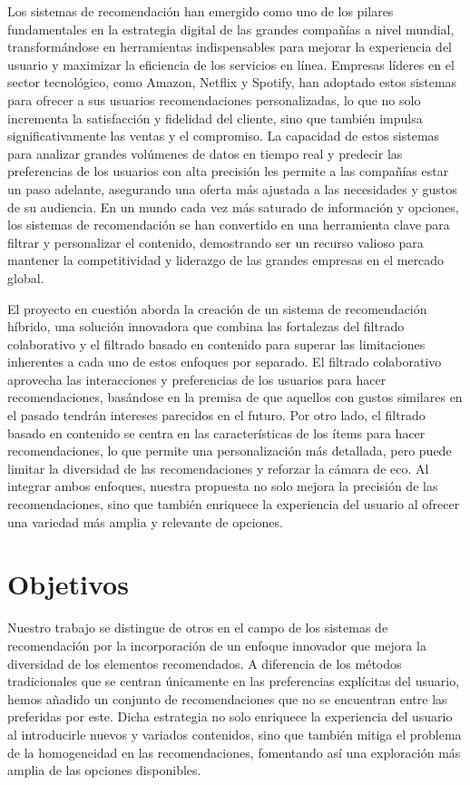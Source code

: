 \documentclass[a4paper,12pt]{report}
\begin{document}
Los sistemas de recomendación han emergido como uno de los pilares fundamentales en la estrategia digital de las grandes compañías a nivel mundial, transformándose en herramientas indispensables para mejorar la experiencia del usuario y maximizar la eficiencia de los servicios en línea. Empresas líderes en el sector tecnológico, como Amazon, Netflix y Spotify, han adoptado estos sistemas para ofrecer a sus usuarios recomendaciones personalizadas, lo que no solo incrementa la satisfacción y fidelidad del cliente, sino que también impulsa significativamente las ventas y el compromiso. La capacidad de estos sistemas para analizar grandes volúmenes de datos en tiempo real y predecir las preferencias de los usuarios con alta precisión les permite a las compañías estar un paso adelante, asegurando una oferta más ajustada a las necesidades y gustos de su audiencia. En un mundo cada vez más saturado de información y opciones, los sistemas de recomendación se han convertido en una herramienta clave para filtrar y personalizar el contenido, demostrando ser un recurso valioso para mantener la competitividad y liderazgo de las grandes empresas en el mercado global.

El proyecto en cuestión aborda la creación de un sistema de recomendación híbrido, una solución innovadora que combina las fortalezas del filtrado colaborativo y el filtrado basado en contenido para superar las limitaciones inherentes a cada uno de estos enfoques por separado. El filtrado colaborativo aprovecha las interacciones y preferencias de los usuarios para hacer recomendaciones, basándose en la premisa de que aquellos con gustos similares en el pasado tendrán intereses parecidos en el futuro. Por otro lado, el filtrado basado en contenido se centra en las características de los ítems para hacer recomendaciones, lo que permite una personalización más detallada, pero puede limitar la diversidad de las recomendaciones y reforzar la cámara de eco.
Al integrar ambos enfoques, nuestra propuesta no solo mejora la precisión de las recomendaciones, sino que también enriquece la experiencia del usuario al ofrecer una variedad más amplia y relevante de opciones.

\section{Objetivos}

Nuestro trabajo se distingue de otros en el campo de los sistemas de recomendación por la incorporación de un enfoque innovador que mejora la diversidad de los elementos recomendados. A diferencia de los métodos tradicionales que se centran únicamente en las preferencias explícitas del usuario, hemos añadido un conjunto de recomendaciones que no se encuentran entre las preferidas por este. Dicha estrategia no solo enriquece la experiencia del usuario al introducirle nuevos y variados contenidos, sino que también mitiga el problema de la homogeneidad en las recomendaciones, fomentando así una exploración más amplia de las opciones disponibles. 
\end{document}
